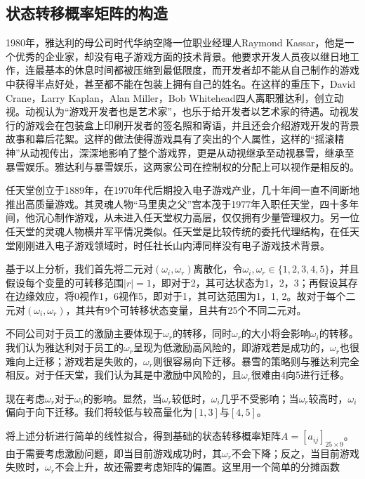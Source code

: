 \documentclass[hyperref]{ctexart}
\begin{document}
\begin{multicols}{2}
	\subsection{状态转移概率矩阵的构造}
    1980年，雅达利的母公司时代华纳空降一位职业经理人Raymond Kassar，他是一个优秀的企业家，却没有电子游戏方面的技术背景。他要求开发人员夜以继日地工作，连最基本的休息时间都被压缩到最低限度，而开发者却不能从自己制作的游戏中获得半点好处，甚至都不能在包装上拥有自己的姓名。在这样的重压下，David Crane，Larry Kaplan，Alan Miller，Bob Whitehead四人离职雅达利，创立动视。动视认为“游戏开发者也是艺术家”，也乐于给开发者以艺术家的待遇。动视发行的游戏会在包装盒上印刷开发者的签名照和寄语，并且还会介绍游戏开发的背景故事和幕后花絮。这样的做法使得游戏具有了突出的个人属性，这样的“摇滚精神”从动视传出，深深地影响了整个游戏界，更是从动视继承至动视暴雪，继承至暴雪娱乐。雅达利与暴雪娱乐，这两家公司在控制权的分配上可以视作是相反的。
    \par
    任天堂创立于1889年，在1970年代后期投入电子游戏产业，几十年间一直不间断地推出高质量游戏。其灵魂人物“马里奥之父”宫本茂于1977年入职任天堂，四十多年间，他沉心制作游戏，从未进入任天堂权力高层，仅仅拥有少量管理权力。另一位任天堂的灵魂人物横井军平情况类似。任天堂是比较传统的委托代理结构，在任天堂刚刚进入电子游戏领域时，时任社长山内溥同样没有电子游戏技术背景。
    \par
    基于以上分析，我们首先将二元对$(\omega_i, \omega_r)$离散化，令$\omega_i , \omega_r \in \{1,2,3,4,5\} $，并且假设每个变量的可转移范围$|r| = 1$，即对于2，其可达状态为1，2，3；再假设其存在边缘效应，将0视作1，6视作5，即对于1，其可达范围为1，1, 2。故对于每个二元对$(\omega_i, \omega_r)$，其共有9个可转移状态变量，且共有25个不同二元对。
    \par
    不同公司对于员工的激励主要体现于$\omega_r$的转移，同时$\omega_r$的大小将会影响$\omega_i$的转移。我们认为雅达利对于员工的$\omega_r$呈现为低激励高风险的，即游戏若是成功的，$\omega_r$也很难向上迁移；游戏若是失败的，$\omega_r$则很容易向下迁移。暴雪的策略则与雅达利完全相反。对于任天堂，我们认为其是中激励中风险的，且$\omega_r$很难由4向5进行迁移。
    \par
    现在考虑$\omega_r$对于$\omega_i$的影响。显然，当$\omega_r$较低时，$\omega_i$几乎不受影响；当$\omega_r$较高时，$\omega_i$偏向于向下迁移。我们将较低与较高量化为$[1, 3]$与$[4,5]$。
    \par
    将上述分析进行简单的线性拟合，得到基础的状态转移概率矩阵$A = [a_{ij}]_{25 \times 9}$。由于需要考虑激励问题，即当目前游戏成功时，其$\omega_r$不会下降；反之，当目前游戏失败时，$\omega_r$不会上升，故还需要考虑矩阵的偏置。这里用一个简单的分摊函数\\\par

\end{multicols}
\end{document}
